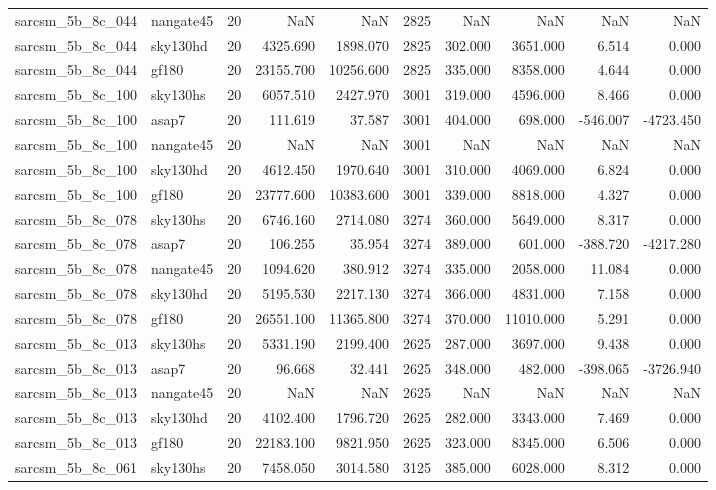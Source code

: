 \begin{tabular}{llrrrrrrrr}
sarcsm\_5b\_8c\_044 & nangate45 & 20 & NaN & NaN & 2825 & NaN & NaN & NaN & NaN \\
sarcsm\_5b\_8c\_044 & sky130hd & 20 & 4325.690 & 1898.070 & 2825 & 302.000 & 3651.000 & 6.514 & 0.000 \\
sarcsm\_5b\_8c\_044 & gf180 & 20 & 23155.700 & 10256.600 & 2825 & 335.000 & 8358.000 & 4.644 & 0.000 \\
sarcsm\_5b\_8c\_100 & sky130hs & 20 & 6057.510 & 2427.970 & 3001 & 319.000 & 4596.000 & 8.466 & 0.000 \\
sarcsm\_5b\_8c\_100 & asap7 & 20 & 111.619 & 37.587 & 3001 & 404.000 & 698.000 & -546.007 & -4723.450 \\
sarcsm\_5b\_8c\_100 & nangate45 & 20 & NaN & NaN & 3001 & NaN & NaN & NaN & NaN \\
sarcsm\_5b\_8c\_100 & sky130hd & 20 & 4612.450 & 1970.640 & 3001 & 310.000 & 4069.000 & 6.824 & 0.000 \\
sarcsm\_5b\_8c\_100 & gf180 & 20 & 23777.600 & 10383.600 & 3001 & 339.000 & 8818.000 & 4.327 & 0.000 \\
sarcsm\_5b\_8c\_078 & sky130hs & 20 & 6746.160 & 2714.080 & 3274 & 360.000 & 5649.000 & 8.317 & 0.000 \\
sarcsm\_5b\_8c\_078 & asap7 & 20 & 106.255 & 35.954 & 3274 & 389.000 & 601.000 & -388.720 & -4217.280 \\
sarcsm\_5b\_8c\_078 & nangate45 & 20 & 1094.620 & 380.912 & 3274 & 335.000 & 2058.000 & 11.084 & 0.000 \\
sarcsm\_5b\_8c\_078 & sky130hd & 20 & 5195.530 & 2217.130 & 3274 & 366.000 & 4831.000 & 7.158 & 0.000 \\
sarcsm\_5b\_8c\_078 & gf180 & 20 & 26551.100 & 11365.800 & 3274 & 370.000 & 11010.000 & 5.291 & 0.000 \\
sarcsm\_5b\_8c\_013 & sky130hs & 20 & 5331.190 & 2199.400 & 2625 & 287.000 & 3697.000 & 9.438 & 0.000 \\
sarcsm\_5b\_8c\_013 & asap7 & 20 & 96.668 & 32.441 & 2625 & 348.000 & 482.000 & -398.065 & -3726.940 \\
sarcsm\_5b\_8c\_013 & nangate45 & 20 & NaN & NaN & 2625 & NaN & NaN & NaN & NaN \\
sarcsm\_5b\_8c\_013 & sky130hd & 20 & 4102.400 & 1796.720 & 2625 & 282.000 & 3343.000 & 7.469 & 0.000 \\
sarcsm\_5b\_8c\_013 & gf180 & 20 & 22183.100 & 9821.950 & 2625 & 323.000 & 8345.000 & 6.506 & 0.000 \\
sarcsm\_5b\_8c\_061 & sky130hs & 20 & 7458.050 & 3014.580 & 3125 & 385.000 & 6028.000 & 8.312 & 0.000 \\

\end{tabular}
